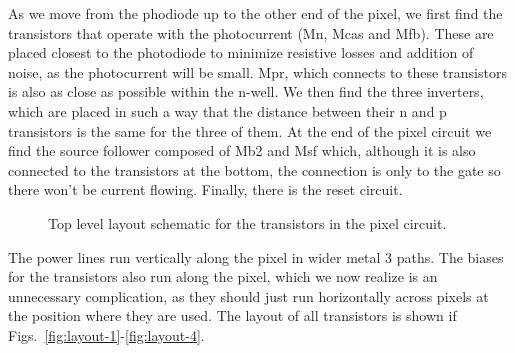 As we move from the phodiode up to the other end of the pixel, we first find the transistors that operate with the photocurrent (Mn, Mcas and Mfb). These are placed closest to the photodiode to minimize resistive losses and addition of noise, as the photocurrent will be small. Mpr, which connects to these transistors is also as close as possible within the n-well. 
We then find the three inverters, which are placed in such a way that the distance between their n and p transistors is the same for the three of them. At the end of the pixel circuit we find the source follower composed of Mb2 and Msf which, although it is also connected to the transistors at the bottom, the connection is only to the gate so there won't be current flowing. 
Finally, there is the reset circuit. 
\begin{figure}[!htb]
    \center
    \vspace{2cm}
    \begin{rotate}{90}
    \end{rotate}
    \caption{Top level layout schematic for the transistors in the pixel circuit.}
    \label{fig:layout-top}
\end{figure}
The power lines run vertically along the pixel in wider metal 3 paths. The biases for the transistors also run along the pixel, which we now realize is an unnecessary complication, as they should just run horizontally across pixels at the position where they are used. The layout of all transistors is shown if Figs.~\ref{fig:layout-1}-\ref{fig:layout-4}.

